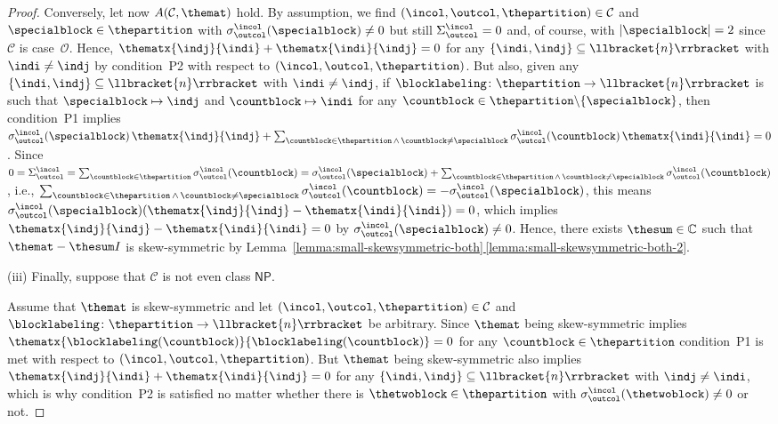 \documentclass[10pt,a4paper]{amsart}
\numberwithin{equation}{section}
\newcommand{\identitymatrix}{I}
\newcommand{\Sand}{\,\wedge\,}
\newcommand{\comps}{\mathbb{C}}
\newcommand{\dwi}[1]{\llbracket{#1}\rrbracket}
\newcommand{\xfromto}[3]{#1 \colon  #2 \to #3}
\newcommand{\tcsx}[2]{\Sigma^{#1}_{#2}}
\newcommand{\csx}[3]{\sigma^{#1}_{#2}(#3)}
\newcommand{\thedim}{n}
\newcommand{\thecat}{\mathcal{C}}
\newcommand{\thepredicatex}[2]{A(#1,#2)}
\newcommand{\conditionone}{P1}
\newcommand{\conditiontwo}{P2}
\newcommand{\onlyneutralpartitions}{\mathsf{NP}}
\begin{document}
{\begin{proof}
      Conversely, let now $\thepredicatex{\thecat}{\themat}$ hold. By assumption, we find $ (\incol,\outcol,\thepartition)\in\thecat$ and  $\specialblock\in\thepartition$ with $\csx{\incol}{\outcol}{\specialblock}\neq 0$ but still $\tcsx{\incol}{\outcol}=0$ and, of course, with  $|\specialblock|=2$ since $\thecat$ is case~$\mathcal{O}$. Hence, $\thematx{\indj}{\indi}+\thematx{\indi}{\indj}=0$ for any $\{\indi,\indj\}\subseteq \dwi{\thedim}$ with $\indi\neq \indj$ by  con\-di\-tion~\conditiontwo{} with respect to $(\incol,\outcol,\thepartition)$. But also, given any $\{\indi,\indj\}\subseteq \dwi{\thedim}$ with $\indi\neq \indj$, if  $\xfromto{\blocklabeling}{\thepartition}{\dwi{\thedim}}$ is such that $\specialblock\mapsto \indj$ and $\countblock\mapsto \indi$ for any $\countblock\in\thepartition\backslash \{\specialblock\}$, then con\-di\-tion~\conditionone{} implies  $\csx{\incol}{\outcol}{\specialblock}\,\thematx{\indj}{\indj}+\sum_{\countblock\in \thepartition\Sand \countblock\neq \specialblock}\csx{\incol}{\outcol}{\countblock}\,\thematx{\indi}{\indi}=0$. Since $0=\tcsx{\incol}{\outcol}=\sum_{\countblock\in \thepartition}\csx{\incol}{\outcol}{\countblock}=\csx{\incol}{\outcol}{\specialblock}+\sum_{\countblock\in \thepartition\Sand \countblock\neq \specialblock}\csx{\incol}{\outcol}{\countblock}$, i.e.,  $\sum_{\countblock\in \thepartition\Sand \countblock\neq \specialblock}\csx{\incol}{\outcol}{\countblock}=-\csx{\incol}{\outcol}{\specialblock}$, this means $\csx{\incol}{\outcol}{\specialblock}(\thematx{\indj}{\indj}-\thematx{\indi}{\indi})=0$, which implies $\thematx{\indj}{\indj}-\thematx{\indi}{\indi}=0$ by $\csx{\incol}{\outcol}{\specialblock}\neq 0$. Hence, there exists $\thesum\in\comps$ such that $\themat-\thesum\identitymatrix$ is skew-symmetric by Lem\-ma~\hyperref[lemma:small-skewsymmetric-both-2]{\ref*{lemma:small-skewsymmetric-both}\,\ref*{lemma:small-skewsymmetric-both-2}}.

      (iii)
 Finally, suppose that  $\thecat$ is not even class $\onlyneutralpartitions$.

  Assume that $\themat$ is skew-symmetric and let $(\incol,\outcol,\thepartition)\in\thecat$ and  $\xfromto{\blocklabeling}{\thepartition}{\dwi{\thedim}}$ be arbitrary.
  Since $\themat$ being skew-symmetric implies $\thematx{\blocklabeling(\countblock)}{\blocklabeling(\countblock)}=0$ for any $\countblock\in\thepartition$ con\-di\-tion~\conditionone{}  is met with respect to $(\incol,\outcol,\thepartition)$. But $\themat$ being skew-symmetric also implies $\thematx{\indj}{\indi}+\thematx{\indi}{\indj}=0$ for any $\{\indi,\indj\}\subseteq\dwi{\thedim}$ with $\indj\neq \indi$, which is why con\-di\-tion~\conditiontwo{} is satisfied no matter whether there is $\thetwoblock\in\thepartition$ with $\csx{\incol}{\outcol}{\thetwoblock}\neq 0$ or not.


\end{proof}}
\end{document}
